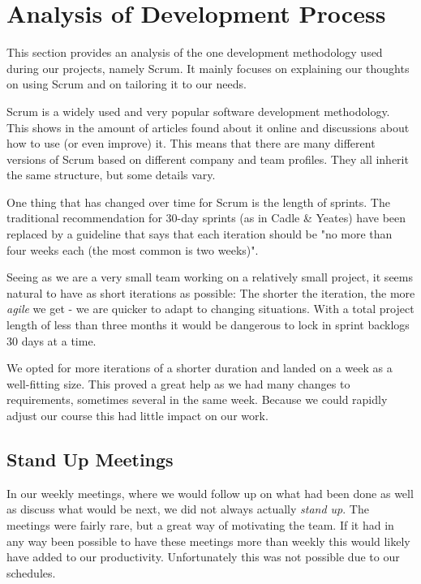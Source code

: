 \section{Analysis of Development Process}
This section provides an analysis of the one development methodology used during our projects, namely Scrum. It mainly focuses on explaining our thoughts on using Scrum and on tailoring it to our needs.
\label{sec:AnalysisOrganizational}

Scrum is a widely used and very popular software development methodology. This shows in the amount
of articles found about it online and discussions about how to use (or even improve) it. This means
that there are many different versions of Scrum based on different company and team profiles. They
all inherit the same structure, but some details vary.

One thing that has changed over time for Scrum is the length of sprints. The traditional recommendation
for 30-day sprints (as in Cadle \& Yeates\cite[ch.~6.3.3]{caye}) have been replaced by a guideline that says that
each iteration should be "no more than four weeks each (the most common is two weeks)"\cite{scrumprime}.

Seeing as we are a very small team working on a relatively small project, it seems natural to have as 
short iterations as possible: The shorter the iteration, the more \emph{agile} we get - we are quicker
to adapt to changing situations. With a total project length of less than three months it would be
dangerous to lock in sprint backlogs 30 days at a time.

We opted for more iterations of a shorter duration and landed on a week as a well-fitting size. This
proved a great help as we had many changes to requirements, sometimes several in the same week. Because
we could rapidly adjust our course this had little impact on our work.

\subsection{Stand Up Meetings}

In our weekly meetings, where we would follow up on what had been done as well as discuss what would be
next, we did not always actually \emph{stand up}. The meetings were fairly rare, but a great way of
motivating the team. If it had in any way been possible to have these meetings more than weekly this would
likely have added to our productivity. Unfortunately this was not possible due to our schedules.

